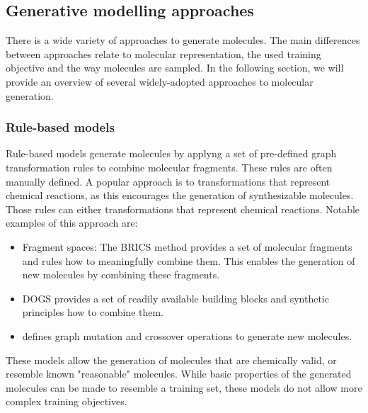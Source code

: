 \subsection{Generative modelling approaches}
There is a wide variety of approaches to generate molecules. The main differences between approaches
relate to molecular representation, the used training objective and the way molecules are sampled.
In the following section, we will provide an overview of several widely-adopted approaches to
molecular generation.

\subsubsection{Rule-based models}
Rule-based models generate molecules by applyng a set of pre-defined graph transformation rules to
combine molecular fragments. These rules are often manually defined. A popular approach is to
transformations that represent chemical reactions, as this encourages the generation of
synthesizable molecules. Those rules can either transformations that represent chemical reactions.
Notable examples of this approach are:
\begin{itemize}
      \item Fragment spaces: The BRICS \citep{degenArtCompilingUsing2008} method provides a set of
            molecular fragments and rules how to meaningfully combine them. This enables the generation of
            new molecules by combining these fragments.
      \item DOGS \citep{hartenfellerDOGSReactionDrivenNovo2012} provides a set of readily available
            building blocks and synthetic principles how to combine them.
      \item \citep{jensenGraphbasedGeneticAlgorithm2019} defines graph mutation and crossover
            operations to generate new molecules.
\end{itemize}
These models allow the generation of molecules that are chemically valid, or resemble known
"reasonable" molecules. While basic properties of the generated molecules can be made to resemble a
training set, these models do not allow more complex training objectives.

